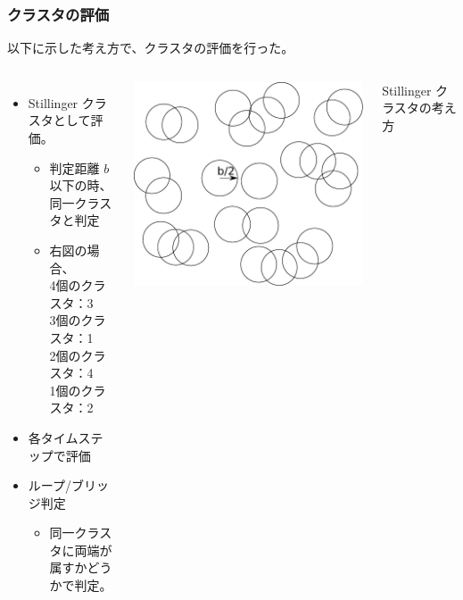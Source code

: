 \documentclass[12pt, dvipdfmx]{beamer}
\begin{document}
\begin{frame}
\frametitle{クラスタの評価}

以下に示した考え方で、クラスタの評価を行った。

\begin{columns}[c, totalwidth=\linewidth]
	\begin{itemize}
	\item
	Stillinger クラスタとして評価。
		\begin{itemize}
		\item
		判定距離 $b$ 以下の時、\\
		同一クラスタと判定
		\item
		右図の場合、\\
		4個のクラスタ：3\\
		3個のクラスタ：1\\
		2個のクラスタ：4\\
		1個のクラスタ：2
		\end{itemize}
	\item
	各タイムステップで評価
	\item
	ループ/ブリッジ判定
		\begin{itemize}
		\item
		同一クラスタに両端が\\属すかどうかで判定。	
		\end{itemize}
	\end{itemize}
\includegraphics[width=\columnwidth]{./fig/clusters.pdf}

Stillinger クラスタの考え方
\end{columns}
\end{frame}
\end{document}
